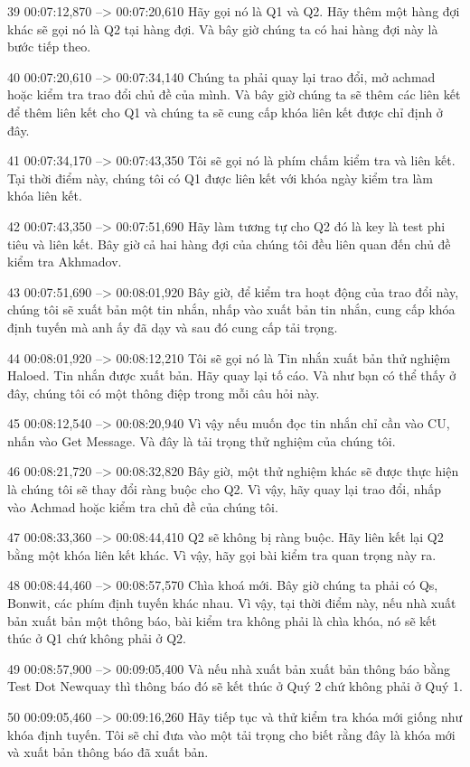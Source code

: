 39
00:07:12,870 --> 00:07:20,610
Hãy gọi nó là Q1 và Q2.  Hãy thêm một hàng đợi khác sẽ gọi nó là Q2 tại hàng đợi.  Và bây giờ chúng ta có hai hàng đợi này là bước tiếp theo.

40
00:07:20,610 --> 00:07:34,140
Chúng ta phải quay lại trao đổi, mở achmad hoặc kiểm tra trao đổi chủ đề của mình.  Và bây giờ chúng ta sẽ thêm các liên kết để thêm liên kết cho Q1 và chúng ta sẽ cung cấp khóa liên kết được chỉ định ở đây.

41
00:07:34,170 --> 00:07:43,350
Tôi sẽ gọi nó là phím chấm kiểm tra và liên kết.  Tại thời điểm này, chúng tôi có Q1 được liên kết với khóa ngày kiểm tra làm khóa liên kết.

42
00:07:43,350 --> 00:07:51,690
Hãy làm tương tự cho Q2 đó là key là test phi tiêu và liên kết.  Bây giờ cả hai hàng đợi của chúng tôi đều liên quan đến chủ đề kiểm tra Akhmadov.

43
00:07:51,690 --> 00:08:01,920
Bây giờ, để kiểm tra hoạt động của trao đổi này, chúng tôi sẽ xuất bản một tin nhắn, nhấp vào xuất bản tin nhắn, cung cấp khóa định tuyến mà anh ấy đã dạy và sau đó cung cấp tải trọng.

44
00:08:01,920 --> 00:08:12,210
Tôi sẽ gọi nó là Tin nhắn xuất bản thử nghiệm Haloed.  Tin nhắn được xuất bản.  Hãy quay lại tố cáo.  Và như bạn có thể thấy ở đây, chúng tôi có một thông điệp trong mỗi câu hỏi này.

45
00:08:12,540 --> 00:08:20,940
Vì vậy nếu muốn đọc tin nhắn chỉ cần vào CU, nhấn vào Get Message.  Và đây là tải trọng thử nghiệm của chúng tôi.

46
00:08:21,720 --> 00:08:32,820
Bây giờ, một thử nghiệm khác sẽ được thực hiện là chúng tôi sẽ thay đổi ràng buộc cho Q2.  Vì vậy, hãy quay lại trao đổi, nhấp vào Achmad hoặc kiểm tra chủ đề của chúng tôi.

47
00:08:33,360 --> 00:08:44,410
Q2 sẽ không bị ràng buộc.  Hãy liên kết lại Q2 bằng một khóa liên kết khác.  Vì vậy, hãy gọi bài kiểm tra quan trọng này ra.

48
00:08:44,460 --> 00:08:57,570
Chìa khoá mới.  Bây giờ chúng ta phải có Qs, Bonwit, các phím định tuyến khác nhau.  Vì vậy, tại thời điểm này, nếu nhà xuất bản xuất bản một thông báo, bài kiểm tra không phải là chìa khóa, nó sẽ kết thúc ở Q1 chứ không phải ở Q2.

49
00:08:57,900 --> 00:09:05,400
Và nếu nhà xuất bản xuất bản thông báo bằng Test Dot Newquay thì thông báo đó sẽ kết thúc ở Quý 2 chứ không phải ở Quý 1.

50
00:09:05,460 --> 00:09:16,260
Hãy tiếp tục và thử kiểm tra khóa mới giống như khóa định tuyến.  Tôi sẽ chỉ đưa vào một tải trọng cho biết rằng đây là khóa mới và xuất bản thông báo đã xuất bản.

